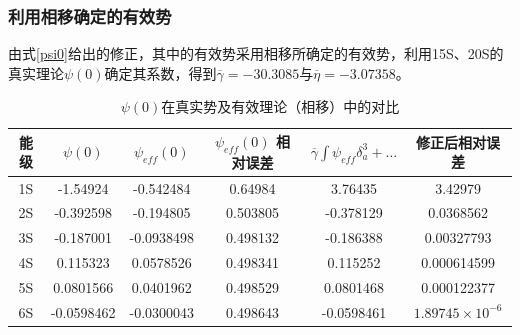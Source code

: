 \documentclass[hyperref,cs4size,titlepage,twoside]{ctexart}
\begin{document}
\subsubsection{利用相移确定的有效势}
由式\eqref{psi0}给出的修正，其中的有效势采用相移所确定的有效势，利用15S、20S的真实理论$\psi(0)$确定其系数，得到$\overline{\gamma}=-30.3085$与$\overline{\eta}=-3.07358$。
\clearpage
\begin{table}[!htbp]
  \centering
  \begin{tabular}{|cccccc|}
    \hline
    能级 & $\psi(0)$ & $\psi_{eff}(0)$ & $\psi_{eff}(0)$ 相对误差& $\overline{\gamma}\int\psi_{eff}\delta^3_a+\dots$ & 修正后相对误差 \\
    \hline
    1S & -1.54924 & -0.542484 &0.64984& 3.76435&3.42979 \\
    2S & -0.392598 & -0.194805 &0.503805& -0.378129&0.0368562 \\
    3S & -0.187001 & -0.0938498 &0.498132& -0.186388&0.00327793 \\
    4S & 0.115323 & 0.0578526 &0.498341& 0.115252&0.000614599 \\
    5S & 0.0801566 & 0.0401962 &0.498529& 0.0801468&0.000122377 \\
    6S & -0.0598462 & -0.0300043 &0.498643& -0.0598461&$1.89745\times10^{-6}$ \\
    \hline
  \end{tabular}
  \caption{$\psi(0)$在真实势及有效理论（相移）中的对比}\label{psi01}
\end{table}
\end{document}
